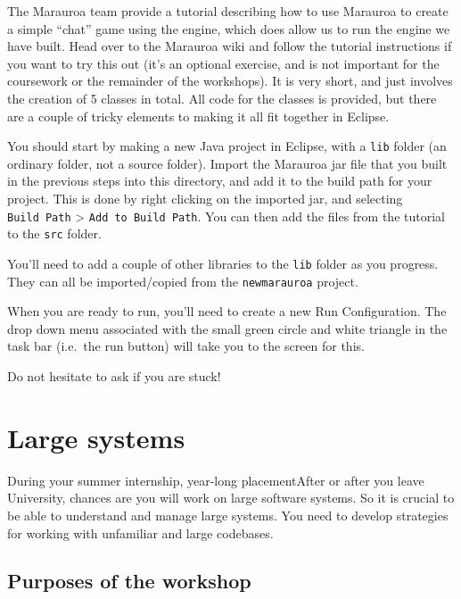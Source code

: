 \documentclass[
]{book}
\begin{document}
The Marauroa team provide a tutorial describing how to use Marauroa to create a simple ``chat'' game using the engine, which does allow us to run the engine we have built. Head over to the Marauroa wiki and follow the tutorial instructions if you want to try this out (it's an optional exercise, and is not important for the coursework or the remainder of the workshops). It is very short, and just involves the creation of 5 classes in total. All code for the classes is provided, but there are a couple of tricky elements to making it all fit together in Eclipse.

You should start by making a new Java project in Eclipse, with a \texttt{lib} folder (an ordinary folder, not a source folder). Import the Marauroa jar file that you built in the previous steps into this directory, and add it to the build path for your project. This is done by right clicking on the imported jar, and selecting \texttt{Build\ Path} \textgreater{} \texttt{Add\ to\ Build\ Path}. You can then add the files from the tutorial to the \texttt{src} folder.

You'll need to add a couple of other libraries to the \texttt{lib} folder as you progress. They can all be imported/copied from the \texttt{newmarauroa} project.

When you are ready to run, you'll need to create a new Run Configuration. The drop down menu associated with the small green circle and white triangle in the task bar (i.e.~the run button) will take you to the screen for this.

Do not hesitate to ask if you are stuck!

\hypertarget{understanding}{%
\chapter{Large systems}\label{understanding}}

During your summer internship, year-long placementAfter or after you leave University, chances are you will work on large software systems. So it is crucial to be able to understand and manage large systems. You need to develop strategies for working with unfamiliar and large codebases.

\hypertarget{purposes}{%
\section*{Purposes of the workshop}\label{purposes}}
\end{document}
